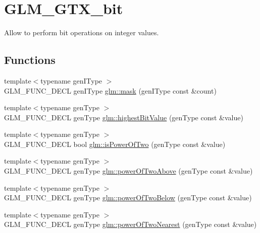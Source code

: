 \hypertarget{group__gtx__bit}{\section{G\-L\-M\-\_\-\-G\-T\-X\-\_\-bit}
\label{group__gtx__bit}
}


Allow to perform bit operations on integer values.  


\subsection*{Functions}
\begin{DoxyCompactItemize}
\item 
{\footnotesize template$<$typename gen\-I\-Type $>$ }\\G\-L\-M\-\_\-\-F\-U\-N\-C\-\_\-\-D\-E\-C\-L gen\-I\-Type \hyperlink{group__gtx__bit_ga79f1482a09c91f785e7e0ea8aed2b20e}{glm\-::mask} (gen\-I\-Type const \&count)
\item 
{\footnotesize template$<$typename gen\-Type $>$ }\\G\-L\-M\-\_\-\-F\-U\-N\-C\-\_\-\-D\-E\-C\-L gen\-Type \hyperlink{group__gtx__bit_ga9621840252c293918780bc3890374b86}{glm\-::highest\-Bit\-Value} (gen\-Type const \&value)
\item 
{\footnotesize template$<$typename gen\-Type $>$ }\\G\-L\-M\-\_\-\-F\-U\-N\-C\-\_\-\-D\-E\-C\-L bool \hyperlink{group__gtx__bit_ga5ddca7546d8be35992eedd3411842545}{glm\-::is\-Power\-Of\-Two} (gen\-Type const \&value)
\item 
{\footnotesize template$<$typename gen\-Type $>$ }\\G\-L\-M\-\_\-\-F\-U\-N\-C\-\_\-\-D\-E\-C\-L gen\-Type \hyperlink{group__gtx__bit_gaa49786cf3f8a1f65de6e70b6088a811e}{glm\-::power\-Of\-Two\-Above} (gen\-Type const \&value)
\item 
{\footnotesize template$<$typename gen\-Type $>$ }\\G\-L\-M\-\_\-\-F\-U\-N\-C\-\_\-\-D\-E\-C\-L gen\-Type \hyperlink{group__gtx__bit_gaeceaea338213cbff7a275460e35e8d0c}{glm\-::power\-Of\-Two\-Below} (gen\-Type const \&value)
\item 
{\footnotesize template$<$typename gen\-Type $>$ }\\G\-L\-M\-\_\-\-F\-U\-N\-C\-\_\-\-D\-E\-C\-L gen\-Type \hyperlink{group__gtx__bit_ga9e68299f4ca0cd6674efbee62d425b95}{glm\-::power\-Of\-Two\-Nearest} (gen\-Type const \&value)
\item 

\end{DoxyCompactItemize}
